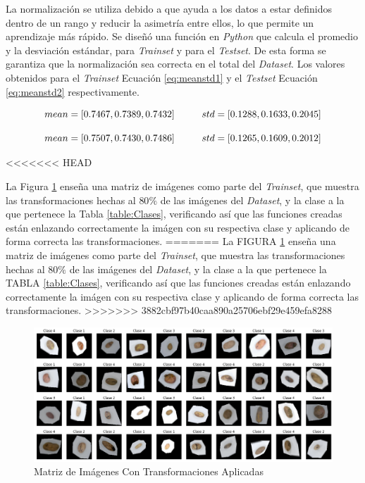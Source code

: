 			La normalización se utiliza debido a que ayuda a los datos a estar definidos dentro de un rango y reducir la asimetría entre ellos, lo que permite un aprendizaje más rápido. Se diseñó una función en \textit{Python} que calcula el promedio y la desviación estándar, para \textit{Trainset} y para el \textit{Testset}. De esta forma se garantiza que la normalización sea correcta en el total del \textit{Dataset}. Los valores obtenidos para el \textit{Trainset} Ecuación \ref{eq:meanstd1} y el \textit{Testset} Ecuación \ref{eq:meanstd2} respectivamente.
			
			\begin{equation}				{mean = [0.7467, 0.7389, 0.7432] \hspace*{1cm}  std  = [0.1288, 0.1633, 0.2045]}
				\label{eq:meanstd1}
			\end{equation}


			\begin{equation}
				{mean = [0.7507, 0.7430, 0.7486] \hspace*{1cm}  std  = [0.1265, 0.1609, 0.2012]}
				\label{eq:meanstd2}
			\end{equation}

<<<<<<< HEAD

			La Figura \ref{fig:agumentation} enseña una matriz de imágenes como parte del \textit{Trainset}, que muestra las transformaciones hechas al $80\%$ de las imágenes del \textit{Dataset}, y la clase a la que pertenece la Tabla \ref{table:Clases}, verificando así que las funciones creadas están enlazando correctamente la imágen con su respectiva clase y aplicando de forma correcta las transformaciones.
=======
			La FIGURA \ref{fig:agumentation} enseña una matriz de imágenes como parte del \textit{Trainset}, que muestra las transformaciones hechas al $80\%$ de las imágenes del \textit{Dataset}, y la clase a la que pertenece la TABLA \ref{table:Clases}, verificando así que las funciones creadas están enlazando correctamente la imágen con su respectiva clase y aplicando de forma correcta las transformaciones.
>>>>>>> 3882cbf97b40caa890a25706ebf29e459efa8288
			
			\begin{figure}[ht]
				\centering
				\includegraphics[scale=0.4]{Figs/augmentation.png}
				\caption{Matriz de Imágenes Con Transformaciones Aplicadas}
				\label{fig:agumentation}
			\end{figure}	

